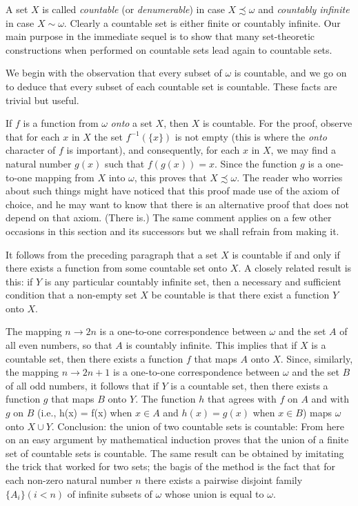 A set $X$ is called \textit{countable} (or \textit{denumerable}) in case $X \precsim \omega$ and \textit{countably infinite} in case $X \sim \omega$. Clearly a countable set is either finite or countably infinite. Our main purpose in the immediate sequel is to show that many set-theoretic constructions when performed on countable sets lead again to countable sets. 

We begin with the observation that every subset of $\omega$ is countable, and we go on to deduce that every subset of each countable set is countable. These facts are trivial but useful.

If $f$ is a function from $\omega$ \textit{onto} a set $X$, then $X$ is countable. For the proof, observe that for each $x$ in $X$ the set $f^{-1}(\{ x \})$ is not empty (this is where the \textit{onto} character of $f$ is important), and consequently, for each $x$ in $X$, we may find a natural number $g(x)$ such that $f(g(x)) = x$. Since the function $g$ is a one-to-one mapping from $X$ into $\omega$, this proves that $X \precsim \omega$. The reader who worries about such things might have noticed that this proof made use of the axiom of choice, and he may want to know that there is an alternative proof that does not depend on that axiom. (There is.) The same comment applies on a few other occasions in this section and its successors but we shall refrain from making it.

It follows from the preceding paragraph that a set $X$ is countable if and only if there exists a function from some countable set onto $X$. A closely related result is this: if $Y$ is any particular countably infinite set, then a necessary and sufficient condition that a non-empty set $X$ be countable is that there exist a function $Y$ onto $X$.

The mapping $n \rightarrow 2n$ is a one-to-one correspondence between $\omega$ and the set $A$ of all even numbers, so that $A$ is countably infinite. This implies that if $X$ is a countable set, then there exists a function $f$ that maps $A$ onto $X$. Since, similarly, the mapping $n \rightarrow 2n + 1$ is a one-to-one correspondence between $\omega$ and the set $B$ of all odd numbers, it follows that if $Y$ is a countable set, then there exists a function $g$ that maps $B$ onto $Y$. The function $h$ that agrees with $f$ on $A$ and with $g$ on $B$ (i.e., h(x) = f(x) when $x \in A$ and $h(x) = g(x)$ when $x \in B$) maps $\omega$ onto $X \cup Y$. Conclusion: the union of two countable sets is countable: From here on an easy argument by mathematical induction proves that the union of a finite set of countable sets is countable. The same result can be obtained by imitating the trick that worked for two sets; the bagis of the method is the fact that for each non-zero natural number $n$ there exists a pairwise disjoint family $\{ A_{i} \} (i < n)$ of infinite subsets of $\omega$ whose union is equal to $\omega$.

